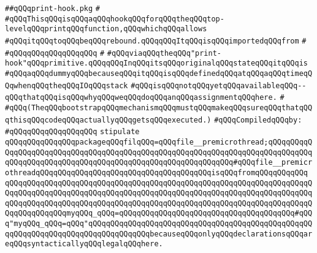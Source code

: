 \label{src/lib/std/src/nj/print-hook.pkg}
\verb|##qQQqprint-hook.pkg|\newline
\verb|#|\newline
\verb|#qQQqThisqQQqisqQQqaqQQqhookqQQqforqQQqtheqQQqtop-levelqQQqprintqQQqfunction,qQQqwhichqQQqallows|\newline
\verb|#qQQqitqQQqtoqQQqbeqQQqrebound.qQQqqQQqItqQQqisqQQqimportedqQQqfrom|\newline
\verb|#|\newline
\verb|#qQQqqQQqqQQqqQQqqQQq|\newline
\verb|#|\newline
\verb|#qQQqviaqQQqtheqQQq"print-hook"qQQqprimitive.qQQqqQQqInqQQqitsqQQqoriginalqQQqstateqQQqitqQQqis|\newline
\verb|#qQQqaqQQqdummyqQQqbecauseqQQqitqQQqisqQQqdefinedqQQqatqQQqaqQQqtimeqQQqwhenqQQqtheqQQqIOqQQqstack|\newline
\verb|#qQQqisqQQqnotqQQqyetqQQqavailableqQQq--qQQqthatqQQqisqQQqwhyqQQqweqQQqdoqQQqanqQQqassignmentqQQqhere.|\newline
\verb|#|\newline
\verb|#qQQq(TheqQQqbootstrapqQQqmechanismqQQqmustqQQqmakeqQQqsureqQQqthatqQQqthisqQQqcodeqQQqactuallyqQQqgetsqQQqexecuted.)|\newline
\newline
\verb|#qQQqCompiledqQQqby:|\newline
\verb|#qQQqqQQqqQQqqQQqqQQq|\newline
\newline
\verb|stipulate|\newline
\verb|qQQqqQQqqQQqqQQqpackageqQQqfilqQQq=qQQqfile__premicrothread;qQQqqQQqqQQqqQQqqQQqqQQqqQQqqQQqqQQqqQQqqQQqqQQqqQQqqQQqqQQqqQQqqQQqqQQqqQQqqQQqqQQqqQQqqQQqqQQqqQQqqQQqqQQqqQQqqQQqqQQqqQQqqQQqqQQq#qQQqfile__premicrothreadqQQqqQQqqQQqqQQqqQQqqQQqqQQqqQQqqQQqqQQqisqQQqfromqQQqqQQqqQQq|\newline
\verb|qQQqqQQqqQQqqQQqqQQqqQQqqQQqqQQqqQQqqQQqqQQqqQQqqQQqqQQqqQQqqQQqqQQqqQQqqQQqqQQqqQQqqQQqqQQqqQQqqQQqqQQqqQQqqQQqqQQqqQQqqQQqqQQqqQQqqQQqqQQqqQQqqQQqqQQqqQQqqQQqqQQqqQQqqQQqqQQqqQQqqQQqqQQqqQQqqQQqqQQqqQQqqQQqqQQqqQQqqQQqqQQqmyqQQq_qQQq=qQQqqQQqqQQqqQQqqQQqqQQqqQQqqQQqqQQqqQQq#qQQq"myqQQq_qQQq=qQQq"qQQqqQQqqQQqqQQqqQQqqQQqqQQqqQQqqQQqqQQqqQQqqQQqqQQqqQQqqQQqqQQqqQQqqQQqqQQqqQQqqQQqbecauseqQQqonlyqQQqdeclarationsqQQqareqQQqsyntacticallyqQQqlegalqQQqhere.|\newline
